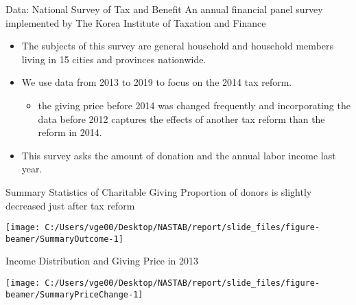 \documentclass[
  ignorenonframetext,
  aspectratio=169,
]{beamer}
\providecommand{\tightlist}{%
  \setlength{\itemsep}{0pt}\setlength{\parskip}{0pt}}
\begin{document}
\begin{frame}{Data: National Survey of Tax and Benefit}
\protect\hypertarget{data-national-survey-of-tax-and-benefit}{}
An annual financial panel survey implemented by The Korea Institute of Taxation and Finance

\begin{itemize}
\tightlist
\item
  The subjects of this survey are general household and household members living in 15 cities and provinces nationwide.
\item
  We use data from 2013 to 2019 to focus on the 2014 tax reform.

  \begin{itemize}
  \tightlist
  \item
    the giving price before 2014 was changed frequently and incorporating the data before 2012 captures the effects of another tax reform than the reform in 2014.
  \end{itemize}
\item
  This survey asks the amount of donation and the annual labor income last year.
\end{itemize}
\end{frame}

\begin{frame}{Summary Statistics of Charitable Giving}
\protect\hypertarget{summary-statistics-of-charitable-giving}{}
Proportion of donors is slightly decreased just after tax reform

\begin{center}\texttt{[image: C:/Users/vge00/Desktop/NASTAB/report/slide\_files/figure-beamer/SummaryOutcome-1]} \end{center}
\end{frame}

\begin{frame}{Income Distribution and Giving Price in 2013}
\protect\hypertarget{income-distribution-and-giving-price-in-2013}{}
\begin{center}\texttt{[image: C:/Users/vge00/Desktop/NASTAB/report/slide\_files/figure-beamer/SummaryPriceChange-1]} \end{center}
\end{frame}
\end{document}
